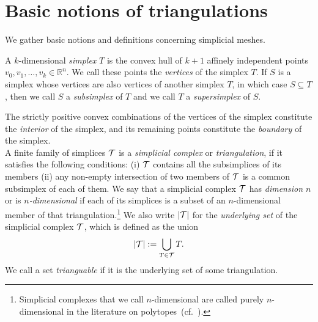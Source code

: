 \documentclass[12pt,a4paper]{article}
\begin{document}
\section{Basic notions of triangulations}\label{section:triangulations}

We gather basic notions and definitions concerning simplicial meshes. 
  
A ${k}$-dimensional \emph{simplex} $T$ is the convex hull of ${k}+1$ affinely independent points $v_0, v_1, \ldots, v_{{k}} \in \mathbb{R}^{n}$. We call these points the \emph{vertices} of the simplex $T$. 
If $S$ is a simplex whose vertices are also vertices of another simplex $T$, in which case $S \subseteq T$, 
then we call $S$ a \textit{subsimplex} of $T$ and we call $T$ a \textit{supersimplex} of $S$. 

The strictly positive convex combinations of the vertices of the simplex constitute the \textit{ interior} of the simplex,
and its remaining points constitute the \textit{boundary} of the simplex.
\\

A finite family of simplices ${\mathcal T}$ is a \emph{simplicial complex} or \emph{triangulation}, if it satisfies the following conditions: 
(i) ${\mathcal T}$ contains all the subsimplices of its members (ii) any non-empty intersection of two members of ${\mathcal T}$ is a common subsimplex of each of them. 
We say that a simplicial complex ${\mathcal T}$ has \textit{dimension $n$} or is \textit{$n$-dimensional} if each of its simplices is a subset of an $n$-dimensional member of that triangulation.\footnote{Simplicial complexes that we call $n$-dimensional are called purely $n$-dimensional in the literature on polytopes~(cf.\ \cite{ziegler2012lectures}).} 
We also write $\left| {\mathcal T} \right|$ for the \textit{underlying set} of the simplicial complex ${\mathcal T}$, which is defined as the union 
\begin{align*}
    \left| {\mathcal T} \right| := \bigcup_{ T \in {\mathcal T} } T
    .
\end{align*}
We call a set \textit{trianguable} if it is the underlying set of some triangulation. 
\end{document}
